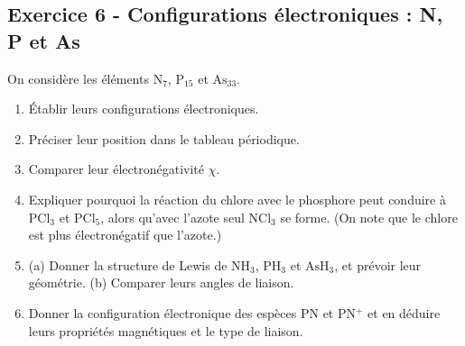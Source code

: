 \documentclass[12pt,a4paper]{article}
\begin{document}
\subsection*{Exercice 6 - Configurations électroniques : N, P et As \niveau{\difficile}}

\begin{boiteexercice}
On considère les éléments $\text{N}_{7}$, $\text{P}_{15}$ et $\text{As}_{33}$.

\begin{enumerate}
  \item Établir leurs configurations électroniques.
  \item Préciser leur position dans le tableau périodique.
  \item Comparer leur électronégativité $\chi$.
  \item Expliquer pourquoi la réaction du chlore avec le phosphore peut conduire à $\text{PCl}_3$ et $\text{PCl}_5$, alors qu'avec l'azote seul $\text{NCl}_3$ se forme. (On note que le chlore est plus électronégatif que l'azote.)
  \item (a) Donner la structure de Lewis de $\text{NH}_3$, $\text{PH}_3$ et $\text{AsH}_3$, et prévoir leur géométrie. (b) Comparer leurs angles de liaison.
  \item Donner la configuration électronique des espèces PN et PN$^+$ et en déduire leurs propriétés magnétiques et le type de liaison.
\end{enumerate}
\end{boiteexercice}
\end{document}
